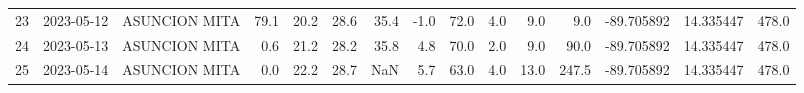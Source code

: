\documentclass[12pt]{article}
\begin{document}
\begin{center}
\begin{tabular}{lllrrrrrrrrrrrr}
23  & 2023-05-12 &  ASUNCION MITA &    79.1 &  20.2 &   28.6 &  35.4 &     -1.0 &     72.0 &  4.0 &         9.0 &         9.0 & -89.705892 &  14.335447 &    478.0 \\
24  & 2023-05-13 &  ASUNCION MITA &     0.6 &  21.2 &   28.2 &  35.8 &      4.8 &     70.0 &  2.0 &         9.0 &        90.0 & -89.705892 &  14.335447 &    478.0 \\
25  & 2023-05-14 &  ASUNCION MITA &     0.0 &  22.2 &   28.7 &   NaN &      5.7 &     63.0 &  4.0 &        13.0 &       247.5 & -89.705892 &  14.335447 &    478.0 \\
\bottomrule
\end{tabular}

        
        \end{center}
        
\end{document}
